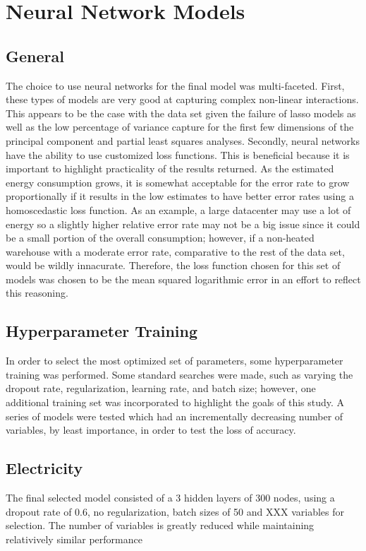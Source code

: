 \section*{Neural Network Models}
\label{sec:nn_models}

\subsection{General}
The choice to use neural networks for the final model was multi-faceted.  First, these types of models are very good at capturing complex non-linear interactions.  This appears to be the case with the data set given the failure of lasso models as well as the low percentage of variance capture for the first few dimensions of the principal component and partial least squares analyses.  Secondly, neural networks have the ability to use customized loss functions.  This is beneficial because it is important to highlight practicality of the results returned.  As the estimated energy consumption grows, it is somewhat acceptable for the error rate to grow proportionally if it results in the low estimates to have better error rates using a homoscedastic loss function.  As an example, a large datacenter may use a lot of energy so a slightly higher relative error rate may not be a big issue since it could be a small portion of the overall consumption; however, if a non-heated warehouse with a moderate error rate, comparative to the rest of the data set, would be wildly innacurate.  Therefore, the loss function chosen for this set of models was chosen to be the mean squared logarithmic error in an effort to reflect this reasoning.

\subsection{Hyperparameter Training}
In order to select the most optimized set of parameters, some hyperparameter training was performed.  Some standard searches were made, such as varying the dropout rate, regularization, learning rate, and batch size; however, one additional training set was incorporated to highlight the goals of this study.  A series of models were tested which had an incrementally decreasing number of variables, by least importance, in order to test the loss of accuracy.
\newpage
\subsection{Electricity}
The final selected model consisted of a 3 hidden layers of 300 nodes, using a dropout rate of 0.6, no regularization, batch sizes of 50 and XXX variables for selection.  The number of variables is greatly reduced while maintaining relativively similar performance

